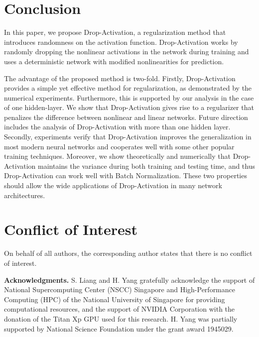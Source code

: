 \documentclass[11pt]{article}
\begin{document}
\section{Conclusion}
In this paper, we propose Drop-Activation, a regularization method that introduces randomness on the activation function. Drop-Activation works by randomly dropping the nonlinear activations in the network during training and uses a deterministic network with modified nonlinearities for prediction.

The advantage of the proposed method is two-fold. Firstly, Drop-Activation provides a simple yet effective method for regularization, as demonstrated by the numerical experiments. Furthermore, this is supported by our analysis in the case of one hidden-layer. We show that Drop-Activation gives rise to a regularizer that penalizes the difference between nonlinear and linear networks. Future direction includes the analysis of Drop-Activation with more than one hidden layer. Secondly, experiments verify that Drop-Activation improves the generalization in most modern neural networks and cooperates well with some other popular training techniques. Moreover, we show theoretically and numerically that Drop-Activation maintains the variance during both training and testing time, and thus Drop-Activation can work well with Batch Normalization. These two properties should allow the wide applications of Drop-Activation in many network architectures.

\section{Conflict of Interest}
On behalf of all authors, the corresponding author states that there is no conflict of interest.

\vspace{1cm}
{\bf Acknowledgments.} S. Liang and H. Yang gratefully acknowledge the support of National Supercomputing Center (NSCC) Singapore \cite{nscc} and High-Performance Computing (HPC) of the National University of Singapore for providing computational resources, and the support of NVIDIA Corporation with the donation of the Titan Xp GPU used for this research. H. Yang was partially supported by National Science Foundation under the grant award 1945029.
\end{document}
